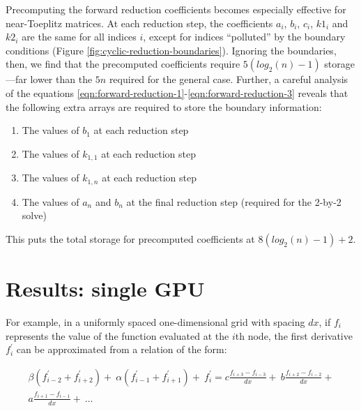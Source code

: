 \documentclass{elsarticle}
\begin{document}
Precomputing the forward reduction coefficients
becomes especially effective for near-Toeplitz matrices.
At each reduction step,
the coefficients $a_i$, $b_i$, $c_i$, $k1_i$ and $k2_i$ 
are the same for all indices $i$,
except for indices ``polluted'' by the boundary conditions
(Figure \ref{fig:cyclic-reduction-boundaries}).
Ignoring the boundaries, then, we find that the precomputed coefficients
require $5(log_2(n) - 1)$ storage---far lower than the $5n$ required for the
general case.
Further, a careful analysis of the equations
\ref{eqn:forward-reduction-1}-\ref{eqn:forward-reduction-3}
reveals that the following extra arrays are required
to store the boundary information:

\begin{enumerate}
    \item The values of $b_1$ at each reduction step
    \item The values of $k_{1,1}$ at each reduction step
    \item The values of $k_{1,n}$ at each reduction step
    \item The values of $a_n$ and $b_n$ at the final reduction step
        (required for the 2-by-2 solve)
\end{enumerate}

This puts the total storage for precomputed coefficients
at $8(log_2(n) - 1)+2$.

\section{Results: single GPU} \label{sec:results-single-gpu}









For example,
in a uniformly spaced one-dimensional grid with spacing $dx$,
if $f_i$ represents the value of
the function evaluated at the $i$th node,
the first derivative $f^{\prime}_i$ can be approximated from
a relation of the form:

\begin{equation}
\begin{split}
    \beta(f^{\prime}_{i-2} + f^{\prime}_{i+2}) + \
    \alpha(f^{\prime}_{i-1} + f^{\prime}_{i+1}) + \
        f^{\prime}_i
    = 
    c\frac{f_{i+3} - f_{i-3}}{dx} + \
    b\frac{f_{i+2} - f_{i-2}}{dx} + \\
    a\frac{f_{i+1} - f_{i-1}}{dx} + \
    \hdots
\end{split}
\label{eqn:general-compact}
\end{equation}
\end{document}
